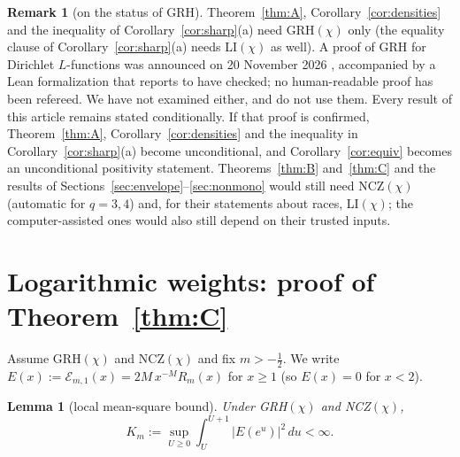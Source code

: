 \documentclass[11pt]{amsart}
\newtheorem{lemma}[theorem]{Lemma}
\theoremstyle{definition}
\newtheorem{remark}[theorem]{Remark}
\numberwithin{equation}{section}
\newcommand{\cE}{\mathcal E}
\begin{document}
\begin{remark}[on the status of GRH]\label{rem:GRHstatus}
Theorem~\ref{thm:A}, Corollary~\ref{cor:densities} and the inequality
of Corollary~\ref{cor:sharp}(a) need GRH$(\chi)$ only (the equality
clause of Corollary~\ref{cor:sharp}(a) needs LI$(\chi)$ as well). A
proof of GRH for Dirichlet $L$-functions was announced on 20 November
2026 \cite{Alp26}, accompanied by a Lean formalization that
\cite{Lean26} reports to have checked; no human-readable proof has
been refereed. We have not examined either, and do not use them.
Every result of this article remains stated conditionally. If that
proof is confirmed, Theorem~\ref{thm:A},
Corollary~\ref{cor:densities} and the inequality in
Corollary~\ref{cor:sharp}(a) become unconditional, and
Corollary~\ref{cor:equiv} becomes an unconditional positivity
statement. Theorems~\ref{thm:B} and~\ref{thm:C} and the results of
Sections~\ref{sec:envelope}--\ref{sec:nonmono} would still need
NCZ$(\chi)$ (automatic for $q=3,4$) and, for their statements about
races, LI$(\chi)$; the computer-assisted ones would also still depend
on their trusted inputs.
\end{remark}

\section{Logarithmic weights: proof of Theorem~\ref{thm:C}}
\label{sec:thmC}

Assume GRH$(\chi)$ and NCZ$(\chi)$ and fix $m>-\tfrac12$. We write
$E(x):=\cE_{m,1}(x)=2M\,x^{-M}R_m(x)$ for $x\ge1$ (so $E(x)=0$ for
$x<2$).

\begin{lemma}[local mean-square bound]\label{lem:localms}
Under GRH$(\chi)$ and NCZ$(\chi)$,
\[
K_m:=\sup_{U\ge0}\int_U^{U+1}\bigl|E(e^u)\bigr|^2\,du<\infty .
\]
\end{lemma}
\end{document}
